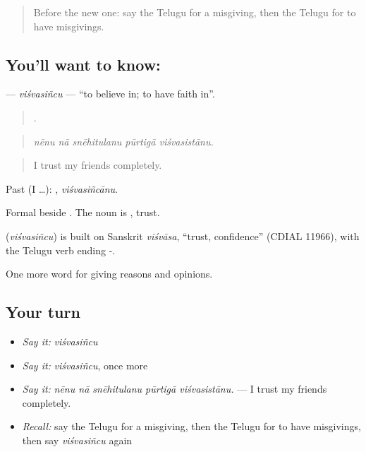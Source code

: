 \label{lesson:TE-C388-visvasincu}



\begin{quote}
Before the new one: say the Telugu for a misgiving, then the Telugu for to have misgivings.
\end{quote}

\subsection*{You'll want to know: }
\textbf{} — \emph{viśvasiñcu} — \textquotedblleft{}to believe in; to have faith in\textquotedblright{}.

\begin{quote}
    .
\end{quote}

\begin{quote}
\emph{nēnu nā snēhitulanu pūrtigā viśvasistānu.}
\end{quote}

\begin{quote}
I trust my friends completely.
\end{quote}

Past (I …): , \emph{viśvasiñcānu}.

Formal beside . The noun is , trust.

\begin{cousinweb}
\textbf{} (\emph{viśvasiñcu}) is built on Sanskrit \emph{viśvāsa}, \textquotedblleft{}trust, confidence\textquotedblright{} (CDIAL 11966), with the Telugu verb ending -.
\end{cousinweb}

\begin{grammarlens}[title={What you've built}]
One more word for giving reasons and opinions.
\end{grammarlens}

\subsection*{Your turn}
\begin{itemize}
\raggedright
  \item \emph{Say it:} \emph{viśvasiñcu}
  \item \emph{Say it:} \emph{viśvasiñcu}, once more
  \item \emph{Say it:} \emph{nēnu nā snēhitulanu pūrtigā viśvasistānu.} — I trust my friends completely.
  \item \emph{Recall:} say the Telugu for a misgiving, then the Telugu for to have misgivings, then say \emph{viśvasiñcu} again
\end{itemize}

